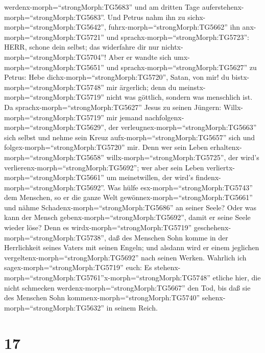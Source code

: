 werdenx-morph=``strongMorph:TG5683'' und am dritten Tage
auferstehenx-morph=``strongMorph:TG5683''.  Und Petrus nahm
ihn zu sichx-morph=``strongMorph:TG5642'',
fuhrx-morph=``strongMorph:TG5662'' ihn anx-morph=``strongMorph:TG5721''
und sprachx-morph=``strongMorph:TG5723'': HERR, schone dein selbst; das
widerfahre dir nur nichtx-morph=``strongMorph:TG5704''! 
Aber er wandte sich umx-morph=``strongMorph:TG5651'' und
sprachx-morph=``strongMorph:TG5627'' zu Petrus: Hebe
dichx-morph=``strongMorph:TG5720'', Satan, von mir! du
bistx-morph=``strongMorph:TG5748'' mir ärgerlich; denn du
meinstx-morph=``strongMorph:TG5719'' nicht was göttlich, sondern was
menschlich ist.  Da sprachx-morph=``strongMorph:TG5627''
Jesus zu seinen Jüngern: Willx-morph=``strongMorph:TG5719'' mir jemand
nachfolgenx-morph=``strongMorph:TG5629'', der
verleugnex-morph=``strongMorph:TG5663'' sich selbst und nehme sein Kreuz
aufx-morph=``strongMorph:TG5657'' sich und
folgex-morph=``strongMorph:TG5720'' mir.  Denn wer sein
Leben erhaltenx-morph=``strongMorph:TG5658''
willx-morph=``strongMorph:TG5725'', der wird's
verlierenx-morph=``strongMorph:TG5692''; wer aber sein Leben
verliertx-morph=``strongMorph:TG5661'' um meinetwillen, der wird's
findenx-morph=``strongMorph:TG5692''.  Was hülfe
esx-morph=``strongMorph:TG5743'' dem Menschen, so er die ganze Welt
gewönnex-morph=``strongMorph:TG5661'' und nähme
Schadenx-morph=``strongMorph:TG5686'' an seiner Seele? Oder was kann der
Mensch gebenx-morph=``strongMorph:TG5692'', damit er seine Seele wieder
löse?  Denn es wirdx-morph=``strongMorph:TG5719''
geschehenx-morph=``strongMorph:TG5738'', daß des Menschen Sohn komme in
der Herrlichkeit seines Vaters mit seinen Engeln; und alsdann wird er
einem jeglichen vergeltenx-morph=``strongMorph:TG5692'' nach seinen
Werken.  Wahrlich ich sagex-morph=``strongMorph:TG5719''
euch: Es
stehenx-morph=``strongMorph:TG5761''x-morph=``strongMorph:TG5748''
etliche hier, die nicht schmecken werdenx-morph=``strongMorph:TG5667''
den Tod, bis daß sie des Menschen Sohn
kommenx-morph=``strongMorph:TG5740'' sehenx-morph=``strongMorph:TG5632''
in seinem Reich.

\hypertarget{section-16}{%
\section{17}\label{section-16}}

